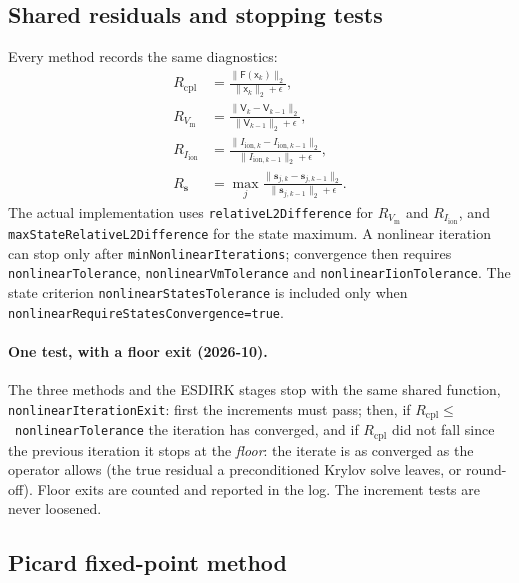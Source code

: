\documentclass[11pt,a4paper]{article}
\newcommand{\code}[1]{\texttt{\small #1}}
\newcommand{\Vm}{V_{\text{m}}}
\newcommand{\Iion}{I_{\mathrm{ion}}}
\newcommand{\Fres}{\mathsf{F}}
\begin{document}
\subsection{Shared residuals and stopping tests}

Every method records the same diagnostics:
\begin{align}
  R_{\mathrm{cpl}} &=
    \frac{\|\Fres(\mathsf{x}_{k})\|_2}
         {\|\mathsf{x}_{k}\|_2+\epsilon},\\
  R_{\Vm} &=
    \frac{\|\mathsf{V}_{k}-\mathsf{V}_{k-1}\|_2}
         {\|\mathsf{V}_{k-1}\|_2+\epsilon},\\
  R_{\Iion} &=
    \frac{\|I_{\mathrm{ion},k}-I_{\mathrm{ion},k-1}\|_2}
         {\|I_{\mathrm{ion},k-1}\|_2+\epsilon},\\
  R_{\mathbf{s}} &=
    \max_j
    \frac{\|\mathbf{s}_{j,k}-\mathbf{s}_{j,k-1}\|_2}
         {\|\mathbf{s}_{j,k-1}\|_2+\epsilon}.
\end{align}
The actual implementation uses \code{relativeL2Difference} for
$R_{\Vm}$ and $R_{\Iion}$, and \code{maxStateRelativeL2Difference} for
the state maximum. A nonlinear iteration can stop only after
\code{minNonlinearIterations}; convergence then requires
\code{nonlinearTolerance}, \code{nonlinearVmTolerance} and
\code{nonlinearIionTolerance}. The state criterion
\code{nonlinearStatesTolerance} is included only when
\code{nonlinearRequireStatesConvergence=true}.

\paragraph{One test, with a floor exit (2026-10).} The three methods and the
ESDIRK stages stop with the same shared function, \code{nonlinearIterationExit}:
first the increments must pass; then, if
$R_{\mathrm{cpl}}\le$~\code{nonlinearTolerance} the iteration has converged, and if
$R_{\mathrm{cpl}}$ did not fall since the previous iteration it stops at the
\emph{floor}: the iterate is as converged as the operator allows (the true residual
a preconditioned Krylov solve leaves, or round-off). Floor exits are counted and
reported in the log. The increment tests are never loosened.

\subsection{Picard fixed-point method}
\end{document}
